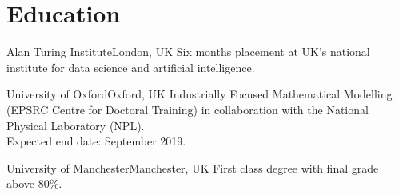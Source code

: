 \documentclass[11pt,a4paper,roman]{moderncv} %
\begin{document}


\section{Education}

        {Alan Turing Institute}{London, UK}{}
        {
          Six months placement at UK's national institute for
          data science and artificial intelligence.
        }

        {University of Oxford}{Oxford, UK}{}
        {
          Industrially Focused Mathematical Modelling 
          (EPSRC Centre for Doctoral Training) 
          in collaboration with the National Physical Laboratory (NPL). \\ 
          Expected end date: September 2019.
        }
%
%

        {University of Manchester}{Manchester, UK}{}
        {
          First class degree with final grade above 80\%.
        }

\end{document}
